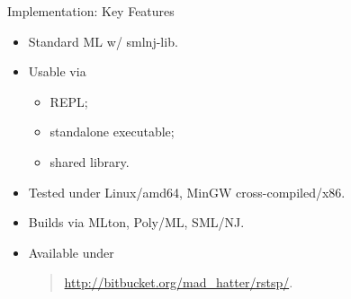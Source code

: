 \documentclass[
  size=8pt,
  style=klope,
  paper=screen,
  pauseslide,
  nopagebreaks,
  hlsections,
  fleqn
]{powerdot}
\begin{document}
\begin{slide}[toc=Key Features]{Implementation: Key Features}
  \begin{itemize}
  \item
  Standard ML w/ smlnj-lib.
  \item
  Usable via
  \begin{itemize}
    \item REPL;
    \item standalone executable;
    \item shared library.
  \end{itemize}
  \item
  Tested under Linux/amd64, MinGW cross-compiled/x86.
  \item
  Builds via MLton, Poly/ML, SML/NJ.
  \item
  Available under
  \begin{quote}
    \hspace{3.4em} \url{http://bitbucket.org/mad_hatter/rstsp/}.
  \end{quote}
  \end{itemize}
\end{slide}
\end{document}
